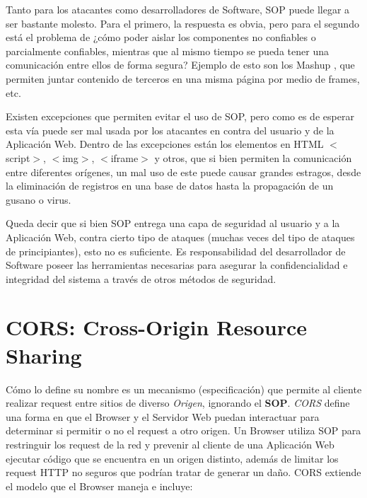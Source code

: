         
   Tanto para los atacantes como desarrolladores de Software, SOP puede llegar a ser bastante molesto. Para el primero, la respuesta es obvia, pero para el segundo está el problema de ¿cómo poder aislar los componentes no confiables o parcialmente confiables, mientras que al mismo tiempo se pueda tener una comunicación entre ellos de forma segura? Ejemplo de esto son los Mashup \cite{barth2009securing}, que permiten juntar contenido de terceros en una misma página por medio de frames, etc. 
        
    Existen excepciones que permiten evitar el uso de SOP, pero como es de esperar esta vía puede ser mal usada por los atacantes en contra del usuario y de la Aplicación Web. Dentro de las excepciones están los elementos en HTML \(<\)script\(>\), \(<\)img\(>\), \(<\)iframe\(>\) y otros, que si bien permiten la comunicación entre diferentes orígenes, un mal uso de este puede causar grandes estragos, desde la eliminación de registros en una base de datos hasta la propagación de un gusano o virus.
        
    Queda decir que si bien SOP entrega una capa de seguridad al usuario y a la Aplicación Web, contra cierto tipo de ataques (muchas veces del tipo de ataques de principiantes), esto no es suficiente. Es responsabilidad del desarrollador de Software poseer las herramientas necesarias para asegurar la confidencialidad e integridad del sistema a través de otros métodos de seguridad.



\section{CORS: Cross-Origin Resource Sharing}
    \label{chap2:CORS}
    Cómo lo define su nombre es un mecanismo (especificación) que permite al cliente realizar request entre sitios de diverso \textit{Origen}, ignorando el \textbf{SOP}. \textit{CORS} define una forma en que el Browser y el Servidor Web puedan interactuar para determinar si permitir o no el request a otro origen. Un Browser utiliza SOP para restringuir los request de la red y prevenir al cliente de una Aplicación Web ejecutar código que se encuentra en un origen distinto, además de limitar los request HTTP no seguros que podrían tratar de generar un daño. CORS extiende el modelo que el Browser maneja e incluye:
        
